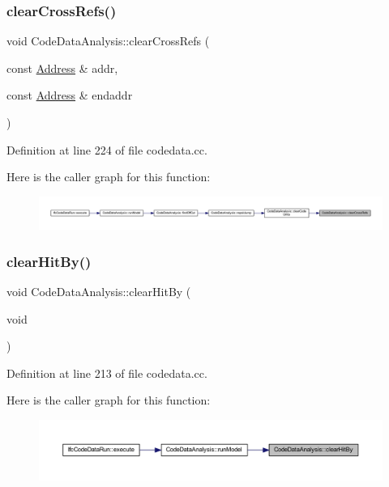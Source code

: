 \subsubsection{\texorpdfstring{clearCrossRefs()}{clearCrossRefs()}}
{\footnotesize\ttfamily void Code\+Data\+Analysis\+::clear\+Cross\+Refs (\begin{DoxyParamCaption}\item[{const \mbox{\hyperlink{class_address}{Address}} \&}]{addr,  }\item[{const \mbox{\hyperlink{class_address}{Address}} \&}]{endaddr }\end{DoxyParamCaption})}



Definition at line 224 of file codedata.\+cc.

Here is the caller graph for this function\+:
\nopagebreak
\begin{figure}[H]
\begin{center}
\leavevmode
\includegraphics[width=350pt]{class_code_data_analysis_a0a06f9379e9589429827bd9aa4cd8b0a_icgraph}
\end{center}
\end{figure}
\mbox{\label{class_code_data_analysis_a8f2c1a7e1a417f0333a5974afdc0e995}} 
\subsubsection{\texorpdfstring{clearHitBy()}{clearHitBy()}}
{\footnotesize\ttfamily void Code\+Data\+Analysis\+::clear\+Hit\+By (\begin{DoxyParamCaption}\item[{void}]{ }\end{DoxyParamCaption})}



Definition at line 213 of file codedata.\+cc.

Here is the caller graph for this function\+:
\nopagebreak
\begin{figure}[H]
\begin{center}
\leavevmode
\includegraphics[width=350pt]{class_code_data_analysis_a8f2c1a7e1a417f0333a5974afdc0e995_icgraph}
\end{center}
\end{figure}
\mbox{\label{class_code_data_analysis_aa6c8fe296a63965974a3cc279e1a7c65}} 
